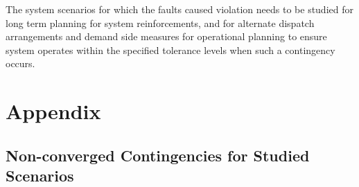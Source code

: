 \documentclass[10pt]{report}
\begin{document}
The system scenarios for which the faults caused violation needs to be studied for long term planning for system reinforcements, and for alternate dispatch arrangements and demand side measures for operational planning to ensure system operates within the specified tolerance levels when such a contingency occurs. 



\chapter*{Appendix}
\label{chapter:app}

\section{Non-converged Contingencies for Studied Scenarios}
\end{document}
